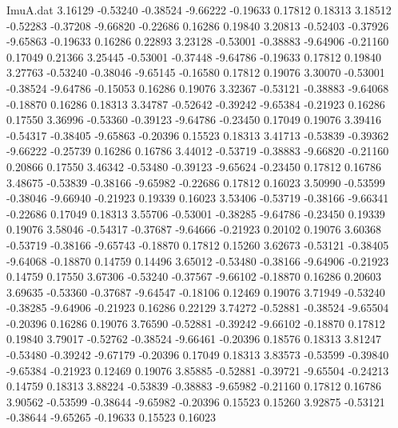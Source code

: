 \begin{filecontents}{ImuA.dat}
   3.16129   -0.53240   -0.38524   -9.66222   -0.19633    0.17812    0.18313
   3.18512   -0.52283   -0.37208   -9.66820   -0.22686    0.16286    0.19840
   3.20813   -0.52403   -0.37926   -9.65863   -0.19633    0.16286    0.22893
   3.23128   -0.53001   -0.38883   -9.64906   -0.21160    0.17049    0.21366
   3.25445   -0.53001   -0.37448   -9.64786   -0.19633    0.17812    0.19840
   3.27763   -0.53240   -0.38046   -9.65145   -0.16580    0.17812    0.19076
   3.30070   -0.53001   -0.38524   -9.64786   -0.15053    0.16286    0.19076
   3.32367   -0.53121   -0.38883   -9.64068   -0.18870    0.16286    0.18313
   3.34787   -0.52642   -0.39242   -9.65384   -0.21923    0.16286    0.17550
   3.36996   -0.53360   -0.39123   -9.64786   -0.23450    0.17049    0.19076
   3.39416   -0.54317   -0.38405   -9.65863   -0.20396    0.15523    0.18313
   3.41713   -0.53839   -0.39362   -9.66222   -0.25739    0.16286    0.16786
   3.44012   -0.53719   -0.38883   -9.66820   -0.21160    0.20866    0.17550
   3.46342   -0.53480   -0.39123   -9.65624   -0.23450    0.17812    0.16786
   3.48675   -0.53839   -0.38166   -9.65982   -0.22686    0.17812    0.16023
   3.50990   -0.53599   -0.38046   -9.66940   -0.21923    0.19339    0.16023
   3.53406   -0.53719   -0.38166   -9.66341   -0.22686    0.17049    0.18313
   3.55706   -0.53001   -0.38285   -9.64786   -0.23450    0.19339    0.19076
   3.58046   -0.54317   -0.37687   -9.64666   -0.21923    0.20102    0.19076
   3.60368   -0.53719   -0.38166   -9.65743   -0.18870    0.17812    0.15260
   3.62673   -0.53121   -0.38405   -9.64068   -0.18870    0.14759    0.14496
   3.65012   -0.53480   -0.38166   -9.64906   -0.21923    0.14759    0.17550
   3.67306   -0.53240   -0.37567   -9.66102   -0.18870    0.16286    0.20603
   3.69635   -0.53360   -0.37687   -9.64547   -0.18106    0.12469    0.19076
   3.71949   -0.53240   -0.38285   -9.64906   -0.21923    0.16286    0.22129
   3.74272   -0.52881   -0.38524   -9.65504   -0.20396    0.16286    0.19076
   3.76590   -0.52881   -0.39242   -9.66102   -0.18870    0.17812    0.19840
   3.79017   -0.52762   -0.38524   -9.66461   -0.20396    0.18576    0.18313
   3.81247   -0.53480   -0.39242   -9.67179   -0.20396    0.17049    0.18313
   3.83573   -0.53599   -0.39840   -9.65384   -0.21923    0.12469    0.19076
   3.85885   -0.52881   -0.39721   -9.65504   -0.24213    0.14759    0.18313
   3.88224   -0.53839   -0.38883   -9.65982   -0.21160    0.17812    0.16786
   3.90562   -0.53599   -0.38644   -9.65982   -0.20396    0.15523    0.15260
   3.92875   -0.53121   -0.38644   -9.65265   -0.19633    0.15523    0.16023

\end{filecontents}
